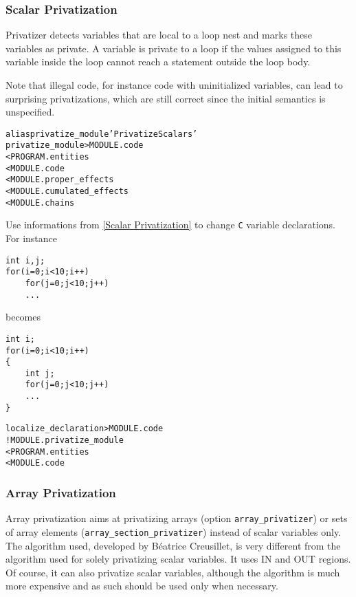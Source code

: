 \documentclass[a4paper]{report}
\newenvironment{PipsMake}{\begin{alltt}}{\end{alltt}}
\begin{document}
\subsubsection{Scalar Privatization}

Privatizer detects variables that are local to a loop nest and marks
these variables as private. A variable is private to a loop if the
values assigned to this variable inside the loop cannot reach a
statement outside the loop body.

Note that illegal code, for instance code with uninitialized
variables, can lead to surprising privatizations, which are still
correct since the initial semantics is unspecified.

\begin{PipsMake}
alias privatize_module 'Privatize Scalars'
privatize_module                    > MODULE.code
        < PROGRAM.entities
        < MODULE.code
        < MODULE.proper_effects
        < MODULE.cumulated_effects
        < MODULE.chains
\end{PipsMake}

Use informations from \ref{Scalar Privatization} to change \texttt{C}
variable declarations.
For instance
\begin{lstlisting}
int i,j;
for(i=0;i<10;i++)
	for(j=0;j<10;j++)
	...
\end{lstlisting}
becomes
\begin{lstlisting}
int i;
for(i=0;i<10;i++)
{
	int j;
	for(j=0;j<10;j++)
	...
}
\end{lstlisting}

\begin{PipsMake}
localize_declaration > MODULE.code
		! MODULE.privatize_module
        < PROGRAM.entities
        < MODULE.code
\end{PipsMake}


\subsubsection{Array Privatization}

Array privatization aims at privatizing arrays (option
\verb|array_privatizer|) or sets of array elements
(\verb|array_section_privatizer|) instead of scalar variables only.
The algorithm used, developed by B\'eatrice C{\sc reusillet}, is very
different from the algorithm used for solely privatizing scalar
variables. It uses IN and OUT regions. Of course, it can also
privatize scalar variables, although the algorithm is much more
expensive and as such should be used only when necessary.
\end{document}
